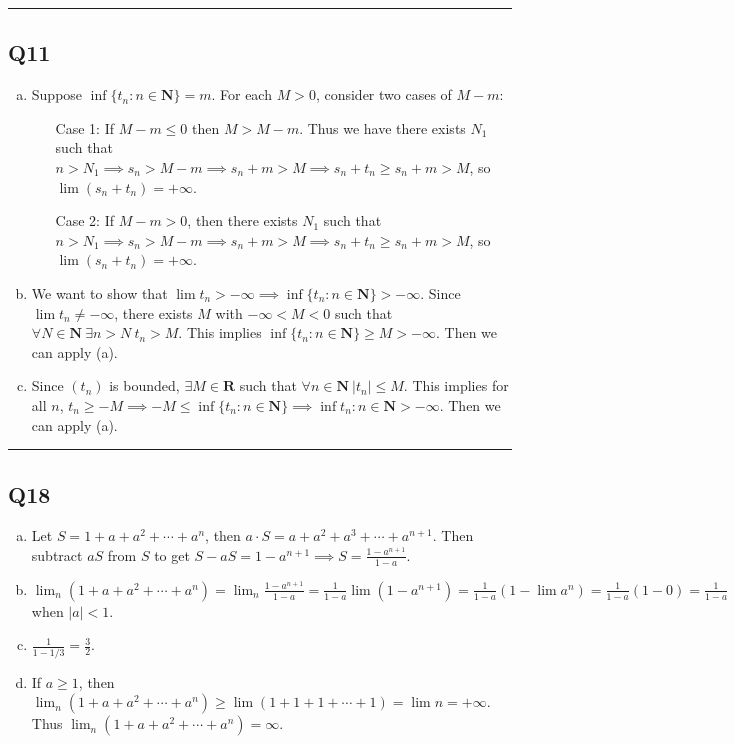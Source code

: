 \documentclass[12pt, lettersize]{article}
\newcommand{\R}{\mathbf{R}}
\newcommand{\N}{\mathbf{N}}
\newcommand{\lline}{\noindent\rule{\textwidth}{1pt}}
\begin{document}
	\lline
	
	\subsection*{Q11}
	\begin{enumerate}[(a)]
		\item Suppose $\inf\{t_n: n\in\N\}=m$. For each $M>0$, consider two cases of $M-m$:
		\begin{itemize}
			\item[Case 1:] If $M-m\leq0$ then $M>M-m$. Thus we have there exists $N_1$ such that $n>N_1\implies s_n>M-m\implies s_n+m>M\implies s_n+t_n\geq s_n+m>M$, so $\lim(s_n+t_n)=+\infty$.
			\item[Case 2:] If $M-m>0$, then there exists $N_1$ such that $n>N_1\implies s_n>M-m\implies s_n+m>M\implies s_n+t_n\geq s_n+m>M$, so $\lim(s_n+t_n)=+\infty$.  
		\end{itemize}
		\item We want to show that $\lim t_n>-\infty\implies \inf\{t_n: n\in\N\}>-\infty$. Since $\lim t_n\neq-\infty$, there exists $M$ with $-\infty<M<0$ such that $\forall N\in\N\ \exists n>N\ t_n>M$. This implies $\inf\{t_n: n\in \N\}\geq M>-\infty$. Then we can apply (a).
		\item Since $(t_n)$ is bounded, $\exists M\in\R$ such that $\forall n\in\N\ |t_n|\leq M$. This implies for all $n$, $t_n\geq -M\implies -M\leq\inf\{t_n: n\in\N\}\implies \inf{t_n: n\in\N}>-\infty$. Then we can apply (a).
	\end{enumerate}
	
	\lline
	
	\subsection*{Q18}
	\begin{enumerate}[(a)]
		\item Let $S=1+a+a^2+\cdots+a^n$, then $a\cdot S=a+a^2+a^3+\cdots+a^{n+1}$. Then subtract $aS$ from $S$ to get $S-aS=1-a^{n+1}\implies S=\frac{1-a^{n+1}}{1-a}$.
		\item $\lim_n(1+a+a^2+\cdots+a^n)=\lim_n\frac{1-a^{n+1}}{1-a}=\frac{1}{1-a}\lim(1-a^{n+1})=\frac{1}{1-a}(1-\lim a^{n})=\frac{1}{1-a}(1-0)=\frac{1}{1-a}$ when $|a|<1$.
		\item $\frac{1}{1-1/3}=\frac{3}{2}$.
		\item If $a\geq1$, then $\lim_n(1+a+a^2+\cdots+a^n)\geq\lim(1+1+1+\cdots+1)=\lim n=+\infty$. Thus $\lim_n(1+a+a^2+\cdots+a^n)=\infty$.
	\end{enumerate}
	
\end{document}
